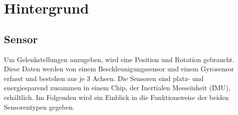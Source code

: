 \chapter{Hintergrund}
\label{ch:background}

\section{Sensor}
Um Gelenkstellungen anzugeben, wird eine Position und Rotation gebraucht.
Diese Daten werden von einem Beschleunigungssensor und einem Gyrosensor erfasst und bestehen aus je 3 Achsen.
Die Sensoren sind platz- und energiesparend zusammen in einem Chip, der Inertialen Messeinheit (IMU), erhältlich.
Im Folgenden wird ein Einblick in die Funktionsweise der beiden Sensorentypen gegeben.

